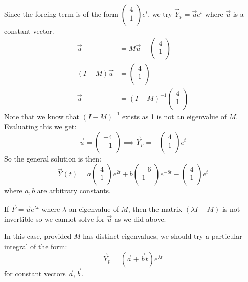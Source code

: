 \documentclass[../main.tex]{subfiles}
\begin{document}
\begin{example}
  Since the forcing term is of the form $\begin{pmatrix}
  4 \\
  1 \\
  \end{pmatrix}e^{t}$, we try $\vec{Y}_p = \vec{u}e^{t}$ where $\vec{u}$ is a constant vector.
  \begin{align*}
    \vec{u} &= M \vec{u} + \begin{pmatrix}
    4 \\
    1 \\
    \end{pmatrix} \\
      (I - M)\vec{u} &= \begin{pmatrix}
    4 \\
    1 \\
    \end{pmatrix} \\
        \vec{u} &= (I - M)^{-1} \begin{pmatrix}
    4 \\
    1 \\
    \end{pmatrix}
  \end{align*}
  Note that we know that $(I - M)^{-1}$ exists as 1 is not an eigenvalue of $M$.
  Evaluating this we get:
  \[
    \vec{u} = \begin{pmatrix}
    -4 \\
    -1 \\
    \end{pmatrix} \implies
    \vec{Y}_p = -\begin{pmatrix}
    4 \\
    1 \\
    \end{pmatrix}e^{t}
  \]
  So the general solution is then:
  \[
    \vec{Y}(t) = a\begin{pmatrix}
    4 \\
    1 \\
    \end{pmatrix}e^{2t} +
    b\begin{pmatrix}
    -6 \\
    1 \\
    \end{pmatrix}e^{-8t} -
    \begin{pmatrix}
    4 \\
    1 \\
    \end{pmatrix}e^{t}
  \]
  where $a, b$ are arbitrary constants.
\end{example}
\begin{remark}
  If $\vec{F} = \vec{u}e^{\lambda t}$ where $\lambda$ an eigenvalue of $M$, then the matrix $(\lambda I - M)$ is not invertible so we cannot solve for $\vec{u}$ as we did above.

  In this case, provided $M$ has distinct eigenvalues, we should try a particular integral of the form:
  \[
    \vec{Y}_p = (\vec{a} + \vec{b} t)e^{\lambda t}
  \]
  for constant vectors $\vec{a}, \vec{b}$.
\end{remark}
\end{document}
